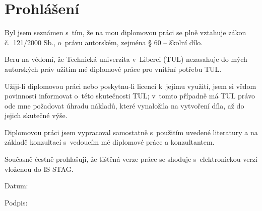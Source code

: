 \documentclass[a4paper,11pt,titlepage,fleqn]{article}
\begin{document}
\thispagestyle{plain}
\section*{Prohlášení}
Byl jsem seznámen s~tím, že na mou diplomovou práci se plně vztahuje zákon č.~121/2000 Sb., o~právu autorském, zejména § 60 – školní dílo. 

Beru na vědomí, že Technická univerzita v~Liberci (TUL) nezasahuje do mých autorských práv užitím mé diplomové práce pro vnitřní potřebu TUL.

Užiji-li diplomovou práci nebo poskytnu-li licenci k~jejímu využití, jsem si vědom povinnosti informovat o~této skutečnosti TUL; v~tomto případně má TUL právo ode mne požadovat úhradu nákladů, které vynaložila na vytvoření díla, až do jejich skutečné výše.

Diplomovou práci jsem vypracoval samostatně s~použitím uvedené literatury a na základě konzultací s~vedoucím mé diplomové práce a konzultantem.

Současně čestně prohlašuji, že tištěná verze práce se shoduje s~elektronickou verzí vloženou do IS STAG.

\vspace{1cm}
Datum:

\vspace{1cm}
Podpis:
\thispagestyle{empty}
\end{document}
